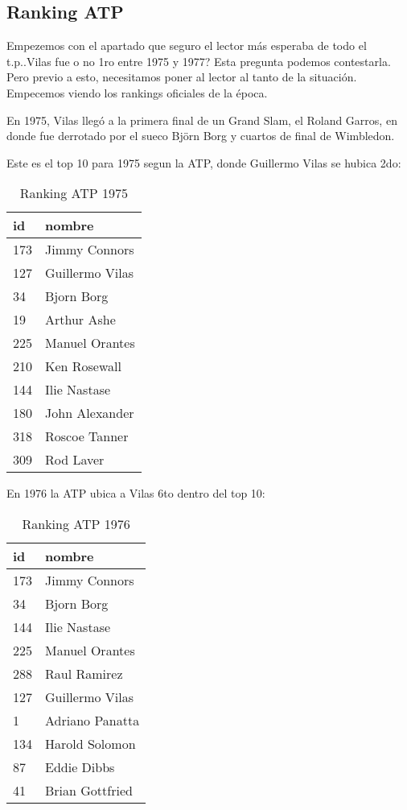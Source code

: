 \subsection{Ranking ATP}

Empezemos con el apartado que seguro el lector más esperaba de todo el t.p..Vilas fue o no 1ro entre 1975 y 1977? Esta pregunta podemos contestarla. Pero previo a esto, necesitamos poner al lector al tanto de la situación. Empecemos viendo los rankings oficiales de la época.

En 1975, Vilas llegó a la primera final de un Grand Slam, el Roland Garros, en donde fue derrotado por el sueco Björn Borg
y cuartos de final de Wimbledon.

Este es el top 10 para 1975 segun la ATP, donde Guillermo Vilas se hubica 2do:

\begin{table}[H]
\label{my-label}
\begin{tabular}{ll}
\hline
id  & nombre \\ \hline
173 & Jimmy Connors \\
127 & Guillermo Vilas \\
34  & Bjorn Borg \\
19  & Arthur Ashe \\
225 & Manuel Orantes \\
210 & Ken Rosewall \\
144 & Ilie Nastase \\
180 & John Alexander \\
318 & Roscoe Tanner \\
309 & Rod Laver \\ \hline
\end{tabular}
\centering
\caption{Ranking ATP 1975}
\end{table}

En 1976 la ATP ubica a Vilas 6to dentro del top 10:

\begin{table}[H]
\label{my-label}
\begin{tabular}{ll}
\hline
id  & nombre \\ \hline
173 & Jimmy Connors \\
34  & Bjorn Borg \\
144 & Ilie Nastase \\
225 & Manuel Orantes \\
288 & Raul Ramirez \\
127 & Guillermo Vilas \\
1   & Adriano Panatta \\
134 & Harold Solomon \\
87  & Eddie Dibbs \\
41  & Brian Gottfried \\ \hline 
\end{tabular}
\centering
\caption{Ranking ATP 1976}
\end{table}

